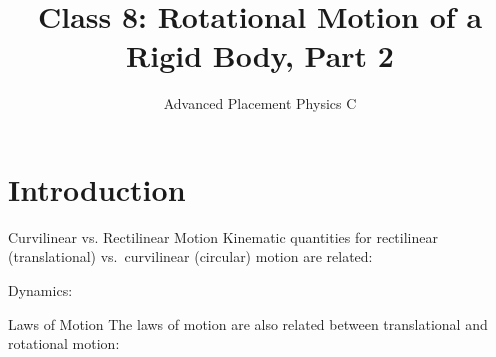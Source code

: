 \documentclass[12pt,compress,aspectratio=169]{beamer}
\title{Class 8: Rotational Motion of a Rigid Body, Part 2}
\subtitle{Advanced Placement Physics C}
\begin{document}
\begin{frame}
  \maketitle
\end{frame}



\section{Introduction}

\begin{frame}{Curvilinear vs. Rectilinear Motion}
  Kinematic quantities for rectilinear (translational) vs.\ curvilinear
  (circular) motion are related:

  \vspace{-.3in}{\large
    \begin{align*}
      \vec r &\quad\rightarrow\quad \theta \\
      \vec v &\quad\rightarrow\quad \omega \\
      \vec a &\quad\rightarrow\quad \alpha
    \end{align*}
  }

  Dynamics:
  
  \vspace{-.3in}{\large
    \begin{align*}
      m &\quad\rightarrow\quad I\\
      \vec F &\quad\rightarrow\quad \vec\tau\\
      \vec p=m\vec v &\quad\rightarrow\quad \vec L=I\vec\omega
    \end{align*}
  }
\end{frame}



\begin{frame}{Laws of Motion}
  The laws of motion are also related between translational and rotational
  motion:
  
\end{frame}
\end{document}
